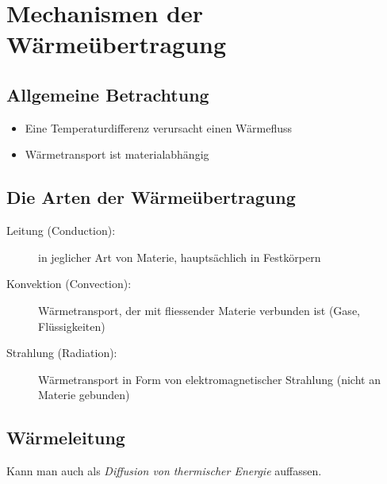 
\section{Mechanismen der Wärmeübertragung} %
	\subsection{Allgemeine Betrachtung} %
		\begin{itemize}
			\item Eine Temperaturdifferenz verursacht einen Wärmefluss
			\item Wärmetransport ist materialabhängig
		\end{itemize}
	\subsection{Die Arten der Wärmeübertragung} %
		\begin{description}
			\item[Leitung (Conduction):] in jeglicher Art von Materie, hauptsächlich in Festkörpern
			\item[Konvektion (Convection):] Wärmetransport, der mit fliessender Materie verbunden ist (Gase, Flüssigkeiten)
			\item[Strahlung (Radiation):] Wärmetransport in Form von elektromagnetischer Strahlung (nicht an Materie gebunden)
		\end{description}
	\subsection{Wärmeleitung} %
		Kann man auch als \emph{Diffusion von thermischer Energie} auffassen.
		
